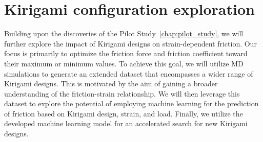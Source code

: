 \chapter{Kirigami configuration exploration}\label{chap:dataset_study}
Building upon the discoveries of the Pilot Study~\cref{chap:pilot_study}, we
will further explore the impact of Kirigami designs on strain-dependent
friction. Our focus is primarily to optimize the friction force and friction
coefficient toward their maximum or minimum values. To achieve this goal, we
will utilize \acrshort{MD} simulations to generate an extended dataset that
encompasses a wider range of Kirigami designs. This is motivated by the aim of
gaining a broader understanding of the friction-strain relationship. We will then leverage this dataset to explore the potential of employing machine
learning for the prediction of friction based on Kirigami design,
strain, and load. Finally, we utilize the developed machine learning model for an
accelerated search for new Kirigami designs. 



